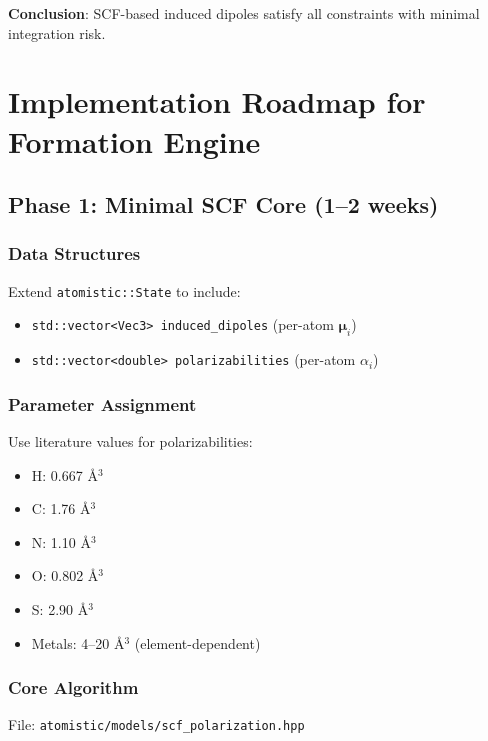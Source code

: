 \documentclass[11pt,letterpaper]{article}
\newcommand{\vmu}{\boldsymbol{\mu}}
\begin{document}
\textbf{Conclusion}: SCF-based induced dipoles satisfy all constraints with minimal integration risk.

\section{Implementation Roadmap for Formation Engine}
\label{sec:implementation}

\subsection{Phase 1: Minimal SCF Core (1--2 weeks)}

\subsubsection{Data Structures}

Extend \texttt{atomistic::State} to include:
\begin{itemize}
    \item \texttt{std::vector<Vec3> induced\_dipoles} (per-atom $\vmu_i$)
    \item \texttt{std::vector<double> polarizabilities} (per-atom $\alpha_i$)
\end{itemize}

\subsubsection{Parameter Assignment}

Use literature values for polarizabilities\cite{miller1990}:
\begin{itemize}
    \item H: 0.667 \AA$^3$
    \item C: 1.76 \AA$^3$
    \item N: 1.10 \AA$^3$
    \item O: 0.802 \AA$^3$
    \item S: 2.90 \AA$^3$
    \item Metals: 4--20 \AA$^3$ (element-dependent)
\end{itemize}

\subsubsection{Core Algorithm}

File: \texttt{atomistic/models/scf\_polarization.hpp}
\end{document}
